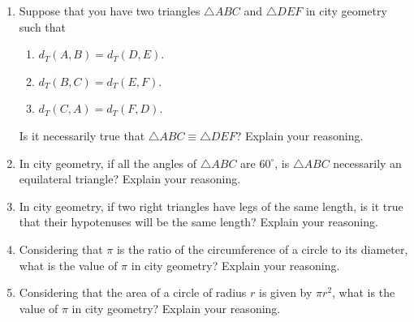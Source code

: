 \begin{problems}
\begin{enumerate}
\item Suppose that you have two triangles $\triangle ABC$ and $\triangle DEF$ in  city geometry such that
\begin{enumerate}
\item $d_T(A,B) = d_T(D,E)$.
\item $d_T(B,C) = d_T(E,F)$.
\item $d_T(C,A) = d_T(F,D)$.
\end{enumerate} 
Is it necessarily true that $\triangle ABC \equiv \triangle DEF$? Explain your reasoning.
\item In city geometry, if all the angles of $\triangle ABC$ are
  $60^\circ$, is $\triangle ABC$ necessarily an equilateral triangle?
  Explain your reasoning.
\item In city geometry, if two right triangles have legs of the same
  length, is it true that their hypotenuses will be the same length?
  Explain your reasoning.
\item Considering that $\pi$ is the ratio of the circumference of a
  circle to its diameter, what is the value of $\pi$ in city geometry?
  Explain your reasoning.

\item Considering that the area of a circle of radius $r$ is given by
  $\pi r^2$, what is the value of $\pi$ in city geometry? Explain your
  reasoning.


\end{enumerate}
\end{problems}
